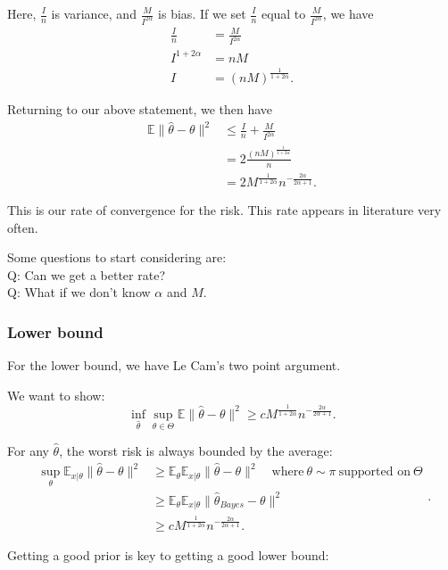 \documentclass[twoside]{article}
\theoremstyle{definition}
\theoremstyle{definition}
\theoremstyle{remark}
\begin{document}
Here, $\frac{I}{n}$ is variance, and $\frac{M}{I^{2\alpha}}$ is bias. If we set $\frac{I}{n}$ equal to $\frac{M}{I^{2\alpha}}$, we have
\[
\begin{aligned}
\frac{I}{n} &= \frac{M}{I^{2\alpha}} \\
I^{1+2\alpha} &= nM \\
I &= (nM)^{\frac{1}{1+2\alpha}}.
\end{aligned}
\]

Returning to our above statement, we then have
\[
\begin{aligned}
\mathbb{E} \| \hat\theta - \theta \|^2  &\leq \frac{I}{n} + \frac{M}{I^{2\alpha}} \\
&= 2 \frac{(nM)^{\frac{1}{1 + 2\alpha}}}{n} \\
&= 2 M^{\frac{1}{1+2\alpha}} n^{-\frac{2\alpha}{2\alpha+1}}.
\end{aligned}
\]

This is our rate of convergence for the risk. This rate appears in literature very often.

Some questions to start considering are: \\ Q: Can we get a better rate? \\ Q: What if we don't know $\alpha$ and $M$.

\subsubsection{Lower bound}

For the lower bound, we have Le Cam's two point argument.

We want to show:
\[
\inf \limits_{\hat\theta} \sup \limits_{\theta \in \Theta} \mathbb{E} \| \hat\theta - \theta \|^2 \geq c M^{\frac{1}{1+2\alpha}} n^{-\frac{2\alpha}{2\alpha+1}}.
\]

For any $\hat\theta$, the worst risk is always bounded by the average: 
\[
\begin{aligned}
\sup \limits_{\theta} \mathbb{E}_{x|\theta} \| \hat\theta - \theta \|^2 &\geq \mathbb{E}_{\theta} \mathbb{E}_{x|\theta} \| \hat\theta - \theta \|^2 \quad \text{where} \ \theta \sim \pi \ \text{supported on} \ \Theta \\
&\geq \mathbb{E}_\theta \mathbb{E}_{x|\theta} \| \hat\theta_{Bayes} - \theta \|^2 \\
&\geq c M^{\frac{1}{1+2\alpha}} n^{-\frac{2\alpha}{2\alpha+1}}.
\end{aligned}.
\] 

Getting a good prior is key to getting a good lower bound:
\end{document}
